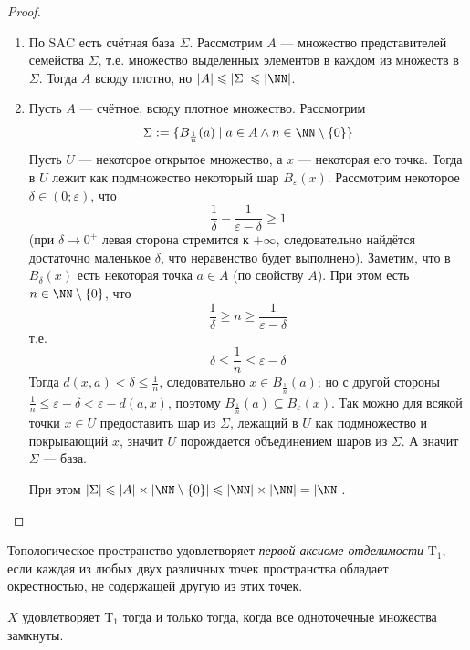 \documentclass[12pt,a4paper]{article}
\newcommand{\SAC}{\ensuremath{\mathrm{SAC}}\xspace}
\newcommand{\T}{\ensuremath{\mathrm{T}}\xspace}
\begin{document}
    \begin{proof}\ 
        \begin{enumerate}
            \item По \SAC есть счётная база $\Sigma$. Рассмотрим $A$ --- множество представителей семейства $\Sigma$, т.е. множество выделенных элементов в каждом из множеств в $\Sigma$. Тогда $A$ всюду плотно, но $|A| \leqslant |\Sigma| \leqslant |\NN|$.

            \item Пусть $A$ --- счётное, всюду плотное множество. Рассмотрим
                \[\Sigma := \{B_{\frac{1}{n}}(a) \mid a \in A \wedge n \in \NN \setminus \{0\}\}\]
                Пусть $U$ --- некоторое открытое множество, а $x$ --- некоторая его точка. Тогда в $U$ лежит как подмножество некоторый шар $B_\varepsilon(x)$. Рассмотрим некоторое $\delta \in (0; \varepsilon)$, что
                \[\frac{1}{\delta} - \frac{1}{\varepsilon - \delta} \geqslant 1\]
                (при $\delta \to 0^+$ левая сторона стремится к $+\infty$, следовательно найдётся достаточно маленькое $\delta$, что неравенство будет выполнено). Заметим, что в $B_\delta(x)$ есть некоторая точка $a \in A$ (по свойству $A$). При этом есть $n \in \NN \setminus \{0\}$, что
                \[\frac{1}{\delta} \geqslant n \geqslant \frac{1}{\varepsilon - \delta}\]
                т.е.
                \[\delta \leqslant \frac{1}{n} \leqslant \varepsilon - \delta\]
                Тогда $d(x, a) < \delta \leqslant \frac{1}{n}$, следовательно $x \in B_{\frac{1}{n}}(a)$; но с другой стороны $\frac{1}{n} \leqslant \varepsilon - \delta < \varepsilon - d(a, x)$, поэтому $B_\frac{1}{n}(a) \subseteq B_\varepsilon(x)$. Так можно для всякой точки $x \in U$ предоставить шар из $\Sigma$, лежащий в $U$ как подмножество и покрывающий $x$, значит $U$ порождается объединением шаров из $\Sigma$. А значит $\Sigma$ --- база.

                При этом $|\Sigma| \leqslant |A| \times |\NN \setminus \{0\}| \leqslant |\NN| \times |\NN| = |\NN|$.
        \end{enumerate}
    \end{proof}

    \begin{definition}
        Топологическое пространство удовлетворяет \emph{первой аксиоме отделимости} $\T_1$, если каждая из любых двух различных точек пространства обладает окрестностью, не содержащей другую из этих точек.
    \end{definition}

    \begin{theorem}
        $X$ удовлетворяет $\T_1$ тогда и только тогда, когда все одноточечные множества замкнуты.
    \end{theorem}
\end{document}
